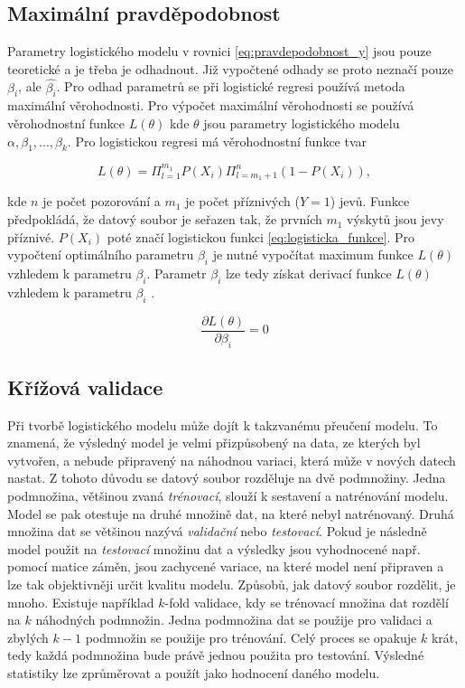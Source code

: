\subsection{Maximální pravděpodobnost}
Parametry logistického modelu v rovnici \ref{eq:pravdepodobnost_y} jsou pouze teoretické a je třeba je odhadnout. Již vypočtené odhady
se proto neznačí pouze $\beta_i$, ale $\hat{\beta_i}$. Pro odhad parametrů se při logistické regresi používá metoda maximální věrohodnosti. Pro výpočet
maximální věrohodnosti se používá věrohodnostní funkce $L(\theta)$ kde $\theta$ jsou parametry logistického modelu $\alpha, \beta_1, ..., \beta_k$.
Pro logistickou regresi má věrohodnostní funkce tvar

\begin{equation}
    \label{eq:pravdepodobnostni_fce}
    L(\theta) = \Pi_{l = 1}^{m_1} P(X_i) \Pi_{l = m_1 + 1}^{n} (1 - P(X_i)),
\end{equation}

kde $n$ je počet pozorování a $m_1$ je počet příznivých ($Y = 1$) jevů. Funkce předpokládá, že datový soubor je seřazen tak, že prvních $m_1$ výskytů
jsou jevy příznivé. $P(X_i)$ poté značí logistickou funkci \ref{eq:logisticka_funkce}. Pro vypočtení optimálního parametru $\beta_i$ je nutné vypočítat
maximum funkce $L(\theta)$ vzhledem k parametru $\beta_i$. Parametr $\beta_i$ lze tedy získat derivací funkce $L(\theta)$ vzhledem k parametru $\beta_i$
\cite{kleinbaum_logistic_2010}.

\begin{equation}
    \frac{\partial L(\theta)}{\partial \beta_i} = 0
\end{equation}

\subsection{Křížová validace}
Při tvorbě logistického modelu může dojít k takzvanému přeučení modelu. To znamená, že výsledný model je velmi přizpůsobený na data, ze kterých byl vytvořen, a nebude
připravený na náhodnou variaci, která může v nových datech nastat. Z tohoto důvodu se datový soubor rozděluje na dvě podmnožiny. Jedna podmnožina, většinou zvaná
\textit{trénovací},
slouží k sestavení a natrénování modelu. Model se pak otestuje
na druhé množině dat, na které nebyl natrénovaný. Druhá množina dat se většinou nazývá \textit{validační} nebo \textit{testovací}. 
Pokud je následně model použit na \textit{testovací} množinu dat a výsledky jsou vyhodnocené např. pomocí matice záměn, jsou zachycené variace,
na které model není připraven a lze tak objektivněji určit kvalitu modelu. Způsobů, jak datový soubor
rozdělit, je mnoho. Existuje například $k$-fold validace, kdy se trénovací množina dat rozdělí na $k$ 
náhodných podmnožin. Jedna podmnožina dat se použije pro validaci a zbylých $k-1$ podmnožin se použije pro trénování.
Celý proces se opakuje $k$ krát, tedy každá podmnožina bude právě jednou použita pro testování. Výsledné statistiky lze zprůměrovat a použít jako hodnocení
daného modelu.

